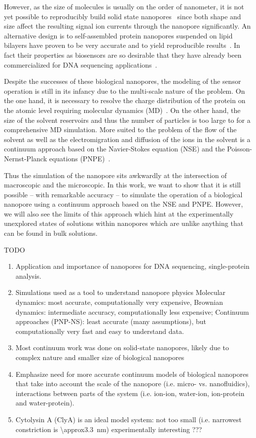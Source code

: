 \documentclass[journal=ancac3, manuscript=article, etalmode=truncate,maxauthors=0]{achemso}
\begin{document}
However, as the size of molecules is usually on the order of nanometer, it is not yet possible to
reproducibly build solid state nanopores~\cite{} since both shape and size affect the resulting
signal ion currents through the nanopore significantly. An alternative design is to self-assembled
protein nanopores suspended on lipid bilayers have proven to be very accurate and to yield
reproducible results~\cite{deam2016}. In fact their properties as biosensors are so desirable that
they have already been commercialized for DNA sequencing applications~\cite{}. 

Despite the successes of these biological nanopores, the modeling of the sensor operation is still
in its infancy due to the multi-scale nature of the problem. On the one hand, it is necessary to
resolve the charge distribution of the protein on the atomic level requiring molecular dynamics
(MD)~\cite{}.  On the other hand, the size of the solvent reservoirs and thus the number of
particles is too large to for a comprehensive MD simulation. More suited to the problem of the
flow of the solvent as well as the electromigration and diffusion of the ions in the solvent is a
continuum approach based on the Navier-Stokes equation (NSE) and the Poisson-Nernst-Planck equations
(PNPE)~\cite{}.

Thus the simulation of the nanopore sits awkwardly at the intersection of macroscopic and the
microscopic. In this work, we want to show that it is still possible -- with remarkable accuracy --
to simulate the operation of a biological nanopore using a continuum approach based on the NSE and
PNPE. However, we will also see the limits of this approach which hint at the experimentally
unexplored states of solutions within nanopores which are unlike anything that can be found in bulk
solutions.


TODO

\begin{enumerate}
	\item Application and importance of nanopores for DNA sequencing, single-protein analysis. 
	\item Simulations used as a tool to understand nanopore physics
	\subitem Molecular dynamics: most accurate, computationally very expensive,
	\subitem Brownian dynamics: intermediate accuracy, computationally less expensive;
	\subitem Continuum approaches (PNP-NS): least accurate (many assumptions), but computationally very fast and easy to understand data.
	\item Most continuum work was done on solid-state nanopores, likely due to complex nature and smaller size of biological nanopores
	\item Emphasize need for more accurate continuum models of biological nanopores that take into account
	\subitem the scale of the nanopore (i.e. micro- vs. nanofluidics),
	\subitem interactions between parts of the system (i.e. ion-ion, water-ion, ion-protein and water-protein).
	\item Cytolysin A (ClyA) is an ideal model system:
	\subitem not too small (i.e. narrowest constriction is \SI{\approx3.3}{\nano\meter})
	\subitem experimentally interesting
	\subitem ???
\end{enumerate}
\end{document}
